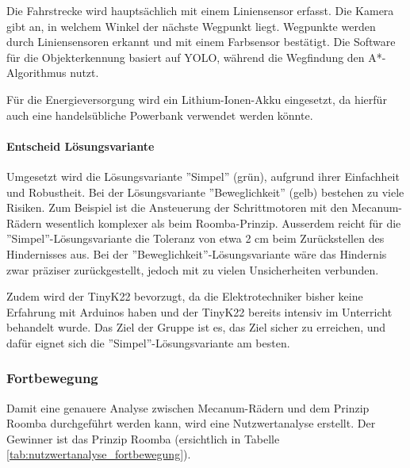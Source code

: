 \documentclass[../main.tex]{subfiles}
\begin{document}
    Die Fahrstrecke wird hauptsächlich mit einem Liniensensor erfasst. Die Kamera gibt an, in welchem Winkel der nächste Wegpunkt liegt. Wegpunkte werden durch Liniensensoren erkannt und mit einem Farbsensor bestätigt. Die Software für die Objekterkennung basiert auf YOLO, während die Wegfindung den A*-Algorithmus nutzt.

    Für die Energieversorgung wird ein Lithium-Ionen-Akku eingesetzt, da hierfür auch eine handelsübliche Powerbank verwendet werden könnte.

    \paragraph{Entscheid Lösungsvariante}
    \label{a3:EntscheidLösungsvariante}
    Umgesetzt wird die Lösungsvariante ''Simpel'' (grün), aufgrund ihrer Einfachheit und Robustheit. Bei der Lösungsvariante ''Beweglichkeit'' (gelb) bestehen zu viele Risiken. Zum Beispiel ist die Ansteuerung der Schrittmotoren mit den Mecanum-Rädern wesentlich komplexer als beim Roomba-Prinzip. Ausserdem reicht für die ''Simpel''-Lösungsvariante die Toleranz von etwa 2 cm beim Zurückstellen des Hindernisses aus. Bei der ''Beweglichkeit''-Lösungsvariante wäre das Hindernis zwar präziser zurückgestellt, jedoch mit zu vielen Unsicherheiten verbunden.

    Zudem wird der TinyK22 bevorzugt, da die Elektrotechniker bisher keine Erfahrung mit Arduinos haben und der TinyK22 bereits intensiv im Unterricht behandelt wurde. Das Ziel der Gruppe ist es, das Ziel sicher zu erreichen, und dafür eignet sich die ''Simpel''-Lösungsvariante am besten.
    
    \subsubsection{Fortbewegung}
    \label{a3:Fortbewegung}
    Damit eine genauere Analyse zwischen Mecanum-Rädern und dem Prinzip Roomba durchgeführt werden kann, wird eine Nutzwertanalyse erstellt. Der Gewinner ist das Prinzip Roomba (ersichtlich in Tabelle \ref{tab:nutzwertanalyse_fortbewegung}).
\end{document}
